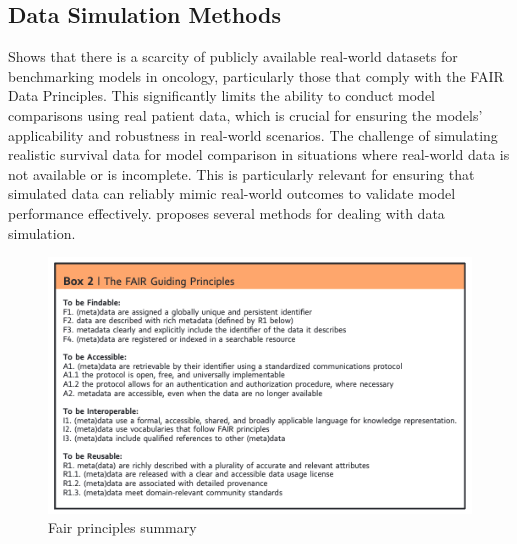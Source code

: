 \subsection{Data Simulation Methods}
\noindent \parencite{thurow_how_2023} Shows that there is a scarcity of publicly available real-world datasets for benchmarking models in oncology, particularly those that comply with the FAIR Data Principles. This significantly limits the ability to conduct model comparisons using real patient data, which is crucial for ensuring the models' applicability and robustness in real-world scenarios. The challenge of simulating realistic survival data for model comparison in situations where real-world data is not available or is incomplete. This is particularly relevant for ensuring that simulated data can reliably mimic real-world outcomes to validate model performance effectively. \parencite{thurow_how_2023} proposes several methods for dealing with data simulation.
\begin{figure}
    \includegraphics[scale=0.85]{Figures/FAIR_PRINCIPLES.png}
    \caption{\parencite{wilkinson_fair_2016} Fair principles summary}
\end{figure}

